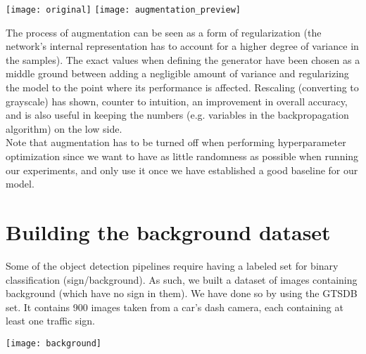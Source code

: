 \begin{center}
\texttt{[image: original]}
\texttt{[image: augmentation\_preview]}
\end{center}
The process of augmentation can be seen as a form of regularization (the network's internal representation has to account for a higher degree of variance in the samples). The exact values when defining the generator have been chosen as a middle ground between adding a negligible amount of variance and regularizing the model to the point where its performance is affected. Rescaling (converting to grayscale) has shown, counter to intuition, an improvement in overall accuracy, and is also useful in keeping the numbers (e.g. variables in the backpropagation algorithm) on the low side.
\\
Note that augmentation has to be turned off when performing hyperparameter optimization since we want to have as little randomness as possible when running our experiments, and only use it once we have established a good baseline for our model.

\section{Building the background dataset}
Some of the object detection pipelines require having a labeled set for binary classification (sign/background). As such, we built a dataset of images containing background (which have no sign in them). We have done so by using the GTSDB\cite{GTSDB} set. It contains 900 images taken from a car's dash camera, each containing at least one traffic sign.

\begin{center}
\texttt{[image: background]}
\end{center}

